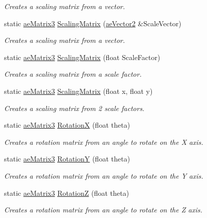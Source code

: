 \begin{DoxyCompactItemize}
\begin{DoxyCompactList}\small\item\em Creates a scaling matrix from a vector. \end{DoxyCompactList}\item 
static \hyperlink{structae_core_1_1ae_matrix3}{ae\+Matrix3} \hyperlink{structae_core_1_1ae_matrix3_a4321c0bb6cdb696d83f44226e2a99324}{Scaling\+Matrix} (\hyperlink{structae_core_1_1ae_vector2}{ae\+Vector2} \&Scale\+Vector)
\begin{DoxyCompactList}\small\item\em Creates a scaling matrix from a vector. \end{DoxyCompactList}\item 
static \hyperlink{structae_core_1_1ae_matrix3}{ae\+Matrix3} \hyperlink{structae_core_1_1ae_matrix3_ac4c3497053ca4456e6ae86e3583ee3fa}{Scaling\+Matrix} (float Scale\+Factor)
\begin{DoxyCompactList}\small\item\em Creates a scaling matrix from a scale factor. \end{DoxyCompactList}\item 
static \hyperlink{structae_core_1_1ae_matrix3}{ae\+Matrix3} \hyperlink{structae_core_1_1ae_matrix3_a02fe9054e3f64428feeadea3973364f6}{Scaling\+Matrix} (float x, float y)
\begin{DoxyCompactList}\small\item\em Creates a scaling matrix from 2 scale factors. \end{DoxyCompactList}\item 
static \hyperlink{structae_core_1_1ae_matrix3}{ae\+Matrix3} \hyperlink{structae_core_1_1ae_matrix3_a9034112410e48d7eda9b692b869fe817}{RotationX} (float theta)
\begin{DoxyCompactList}\small\item\em Creates a rotation matrix from an angle to rotate on the X axis. \end{DoxyCompactList}\item 
static \hyperlink{structae_core_1_1ae_matrix3}{ae\+Matrix3} \hyperlink{structae_core_1_1ae_matrix3_a204bdb33efb9ad0e790bb046f354e021}{RotationY} (float theta)
\begin{DoxyCompactList}\small\item\em Creates a rotation matrix from an angle to rotate on the Y axis. \end{DoxyCompactList}\item 
static \hyperlink{structae_core_1_1ae_matrix3}{ae\+Matrix3} \hyperlink{structae_core_1_1ae_matrix3_a1bdcfb36a05ecc7abe36351777c5c789}{RotationZ} (float theta)
\begin{DoxyCompactList}\small\item\em Creates a rotation matrix from an angle to rotate on the Z axis. \end{DoxyCompactList}\end{DoxyCompactItemize}
